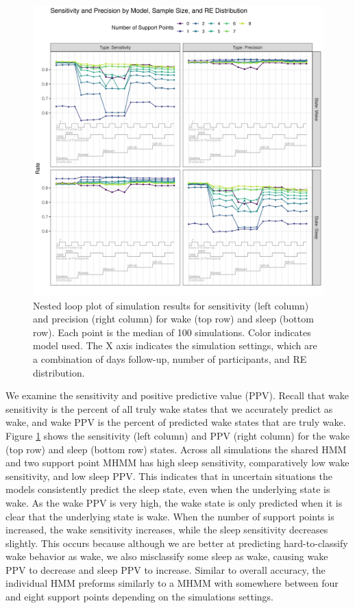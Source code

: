 \documentclass{article}
\begin{document}
\begin{figure}
\includegraphics[scale=.65]{Support/NestedLoopSP.png}
\centering
\caption{Nested loop plot of simulation results for sensitivity (left column) and precision (right column) for wake (top row) and sleep (bottom row). Each point is the median of 100 simulations. Color indicates model used. The X axis indicates the simulation settings, which are a combination of days follow-up, number of participants, and RE distribution.}
\label{NL2}
\end{figure}

We examine the sensitivity and positive predictive value (PPV). Recall that wake sensitivity is the percent of all truly wake states that we accurately predict as wake, and wake PPV is the percent of predicted wake states that are truly wake. Figure \ref{NL2} shows the sensitivity (left column) and PPV (right column) for the wake (top row) and sleep (bottom row) states. Across all simulations the shared HMM and two support point MHMM has high sleep sensitivity, comparatively low wake sensitivity, and low sleep PPV. This indicates that in uncertain situations the models consistently predict the sleep state, even when the underlying state is wake. As the wake PPV is very high, the wake state is only predicted when it is clear that the underlying state is wake. When the number of support points is increased, the wake sensitivity increases, while the sleep sensitivity decreases slightly. This occurs because although we are better at predicting hard-to-classify wake behavior as wake, we also misclassify some sleep as wake, causing wake PPV to decrease and sleep PPV to increase. Similar to overall accuracy, the individual HMM preforms similarly to a MHMM with somewhere between four and eight support points depending on the simulations settings.
\end{document}
